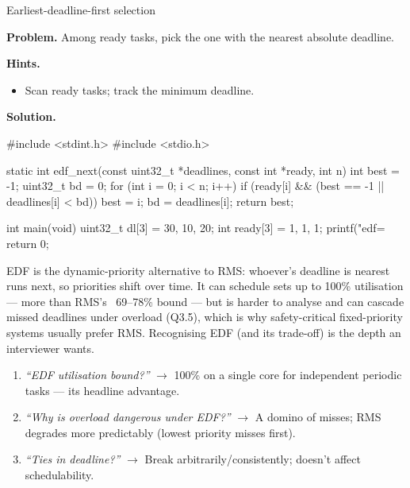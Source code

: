 \begin{gymproblem}{Earliest-deadline-first selection}

\textbf{Problem.} Among ready tasks, pick the one with the nearest absolute
deadline.

\textbf{Hints.}
\begin{itemize}
\item Scan ready tasks; track the minimum deadline.
\end{itemize}

\attempt

\textbf{Solution.}
\begin{cgym}
#include <stdint.h>
#include <stdio.h>

static int edf_next(const uint32_t *deadlines, const int *ready, int n) {
    int best = -1; uint32_t bd = 0;
    for (int i = 0; i < n; i++) {
        if (ready[i] && (best == -1 || deadlines[i] < bd)) {
            best = i; bd = deadlines[i];
        }
    }
    return best;
}

int main(void) {
    uint32_t dl[3] = {30, 10, 20};
    int ready[3]   = {1, 1, 1};
    printf("edf=%
    return 0;
}
\end{cgym}

EDF is the dynamic-priority alternative to RMS: whoever's deadline is nearest
runs next, so priorities shift over time. It can schedule sets up to 100\%
utilisation --- more than RMS's ~69--78\% bound --- but is harder to analyse and
can cascade missed deadlines under overload (Q3.5), which is why safety-critical
fixed-priority systems usually prefer RMS. Recognising EDF (and its trade-off) is
the depth an interviewer wants.

\followups
\begin{enumerate}
\item \emph{``EDF utilisation bound?''} $\rightarrow$ 100\% on a single core for
  independent periodic tasks --- its headline advantage.
\item \emph{``Why is overload dangerous under EDF?''} $\rightarrow$ A domino of
  misses; RMS degrades more predictably (lowest priority misses first).
\item \emph{``Ties in deadline?''} $\rightarrow$ Break arbitrarily/consistently;
  doesn't affect schedulability.
\end{enumerate}
\end{gymproblem}

